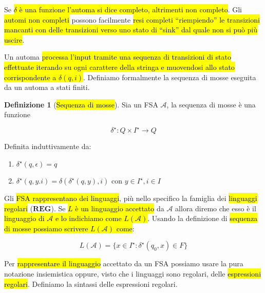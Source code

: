 \documentclass[a4paper,11pt,oneside]{article}
\theoremstyle{plain}
\theoremstyle{definition}
\newtheorem{defn}{Definizione}[section]
\theoremstyle{remark}
\begin{document}
Se \hl{$\delta$ è una funzione l'automa si dice completo, altrimenti non
completo}.  Gli \hl{automi non completi} possono facilmente \hl{resi completi
``riempiendo'' le transizioni mancanti con delle transizioni verso uno stato di
``sink'' dal quale non si può più uscire}.

Un automa \hl{processa l'input tramite una sequenza di transizioni di stato
effettuate iterando su ogni carattere della stringa e muovendosi allo stato
corrispondente a $\delta(q, i)$}. Definiamo formalmente la sequenza di mosse
eseguita da un automa a stati finiti.

\begin{defn}[\hl{Sequenza di mosse}]\label{def:fsa-seq-mosse}
  Sia un FSA $\mathcal{A}$, la sequenza di mosse è una funzione

  \begin{equation}
    \delta^\star: Q \times I^\star \to Q
  \end{equation}

  Definita induttivamente da:

  \begin{enumerate}
    \item $\delta^\star(q, \epsilon) = q$
    \item $\delta^\star(q, y.i) = \delta(\delta^\star(q,y), i)$ con
      $y \in I^\star, i \in I$
  \end{enumerate}
\end{defn}

Gli \hl{FSA rappresentano dei linguaggi}, più nello specifico la famiglia dei
\hl{linguaggi regolari} ($\mathbf{REG}$). Se \hl{$L$ è un linguaggio accettato}
da $\mathcal{A}$ allora diremo che esso è il \hl{linguaggio di $\mathcal{A}$ e
lo indichiamo come $L(\mathcal{A})$}. Usando la definizione di \hl{sequenza di
mosse possiamo scrivere $L(\mathcal{A})$ come}:

\begin{equation}
  L(\mathcal{A}) = \{ x \in I^\star : \delta^\star(q_0, x) \in F \}
\end{equation}

Per \hl{rappresentare il linguaggio} accettato da un FSA possiamo usare la pura
notazione insiemistica oppure, visto che i linguaggi sono regolari, delle
\hl{espressioni regolari}. Definiamo la sintassi delle espressioni regolari.
\end{document}
